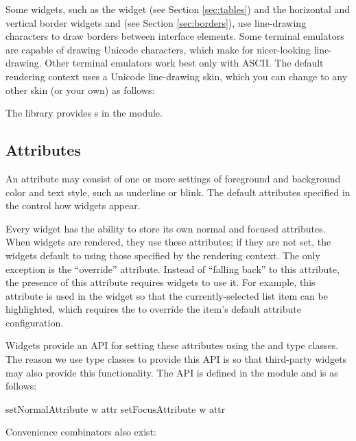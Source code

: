Some widgets, such as the  widget (see Section
\ref{sec:tables}) and the horizontal and vertical border widgets
 and  (see Section \ref{sec:borders}), use
line-drawing characters to draw borders between interface elements.
Some terminal emulators are capable of drawing Unicode characters,
which make for nicer-looking line-drawing.  Other terminal emulators
work best only with ASCII.  The default rendering context uses a
Unicode line-drawing skin, which you can change to any other skin (or
your own) as follows:


The library provides s in the  module.

\subsection{Attributes}
\label{sec:attributes}

An attribute may consist of one or more settings of foreground and
background color and text style, such as underline or blink.  The
default attributes specified in the  control how
widgets appear.

Every widget has the ability to store its own normal and focused
attributes.  When widgets are rendered, they use these attributes; if
they are not set, the widgets default to using those specified by the
rendering context.  The only exception is the ``override'' attribute.
Instead of ``falling back'' to this attribute, the presence of this
attribute requires widgets to use it.  For example, this attribute is
used in the  widget so that the currently-selected list item
can be highlighted, which requires the  to override the
item's default attribute configuration.

Widgets provide an API for setting these attributes using the
 and  type classes.  The
reason we use type classes to provide this API is so that third-party
widgets may also provide this functionality.  The API is defined in
the  module and is as follows:

\begin{haskellcode}
 setNormalAttribute w attr
 setFocusAttribute w attr
\end{haskellcode}

Convenience combinators also exist:

